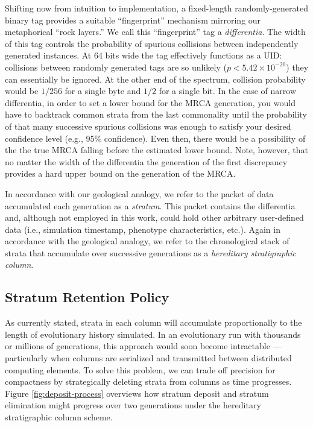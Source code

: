 Shifting now from intuition to implementation, a fixed-length randomly-generated binary tag provides a suitable ``fingerprint'' mechanism mirroring our metaphorical ``rock layers.''
We call this ``fingerprint'' tag a \textit{differentia}.
The width of this tag controls the probability of spurious collisions between independently generated instances.
At 64 bits wide the tag effectively functions as a UID: collisions between randomly generated tags are so unlikely ($p < 5.42\times10^{-20}$) they can essentially be ignored.
At the other end of the spectrum, collision probability would be $1/256$ for a single byte and $1/2$ for a single bit.
In the case of narrow differentia, in order to set a lower bound for the MRCA generation, you would have to backtrack common strata from the last commonality until the probability of that many successive spurious collisions was enough to satisfy your desired confidence level (e.g., 95\% confidence).
Even then, there would be a possibility of the the true MRCA falling before the estimated lower bound.
Note, however, that no matter the width of the differentia the generation of the first discrepancy provides a hard upper bound on the generation of the MRCA.

In accordance with our geological analogy, we refer to the packet of data accumulated each generation as a \textit{stratum}.
This packet contains the differentia and, although not employed in this work, could hold other arbitrary user-defined data (i.e., simulation timestamp, phenotype characteristics, etc.).
Again in accordance with the geological analogy, we refer to the chronological stack of strata that accumulate over successive generations as a \textit{hereditary stratigraphic column}.

\subsection{Stratum Retention Policy}



As currently stated, strata in each column will accumulate proportionally to the length of evolutionary history simulated.
In an evolutionary run with thousands or millions of generations, this approach would soon become intractable --- particularly when columns are serialized and transmitted between distributed computing elements.
To solve this problem, we can trade off precision for compactness by strategically deleting strata from columns as time progresses.
Figure \ref{fig:deposit-process} overviews how stratum deposit and stratum elimination might progress over two generations under the hereditary stratigraphic column scheme.

